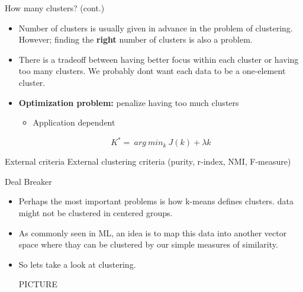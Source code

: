 \documentclass[serif, aspectratio=169]{beamer}
\begin{document}
\begin{frame}{How many clusters? (cont.)}
    \begin{itemize}
        \item Number of clusters is usually given in advance in the problem of clustering. However; finding the \textbf{right} number of clusters is also a problem.
        \item There is a tradeoff between having better focus within each cluster or having too many clusters. We probably dont want each data to be a one-element cluster.
        \item \textbf{Optimization problem:} penalize having too much clusters
        \begin{itemize}
            \item Application dependent
        \end{itemize}
        \[
        K^* = \ arg \ min_k \  J(k) + \lambda k 
        \]
    \end{itemize}
\end{frame}



\begin{frame}{External criteria}
    External clustering criteria (purity, r-index, NMI, F-measure)
\end{frame}


\begin{frame}{Deal Breaker}
    \begin{itemize}
        \item Perhaps the most important problems is how k-means defines clusters. data might not be clustered in centered groups.
        \item As commonly seen in ML, an idea is to map this data into another vector space where thay can be clustered by our simple measures of similarity.
\item So lets take a look at clustering.

PICTURE

        
    \end{itemize}
\end{frame}
\end{document}
